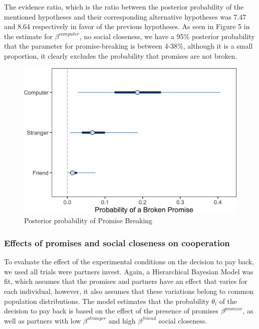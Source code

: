 \documentclass[12pt,]{article}
\begin{document}
The evidence ratio, which is the ratio between the posterior probability
of the mentioned hypotheses and their corresponding alternative
hypotheses was 7.47 and 8.64 respectively in favor of the previous
hypotheses. As seen in Figure 5 in the estimate for
\(\beta^{computer}\), no social closeness, we have a 95\% posterior
probability that the parameter for promise-breaking is between 4-38\%,
although it is a small proportion, it clearly excludes the probability
that promises are not broken.

\begin{figure}

{\centering \includegraphics[width=0.8\linewidth]{article_english_files/figure-latex/fig3-1} 

}

\caption{Posterior probability of Promise Breaking}\label{fig:fig3}
\end{figure}

\hypertarget{effects-of-promises-and-social-closeness-on-cooperation}{%
\subsubsection{Effects of promises and social closeness on
cooperation}\label{effects-of-promises-and-social-closeness-on-cooperation}}

To evaluate the effect of the experimental conditions on the decision to
pay back, we used all trials were partners invest. Again, a Hierarchical
Bayesian Model was fit, which assumes that the promises and partners
have an effect that varies for each individual, however, it also assumes
that these variations belong to common population distributions. The
model estimates that the probability \(\theta_i\) of the decision to pay
back is based on the effect of the presence of promises
\(\beta^{promise}\), as well as partners with low \(\beta^{stranger}\)
and high \(\beta^{friend}\) social closeness.
\end{document}
